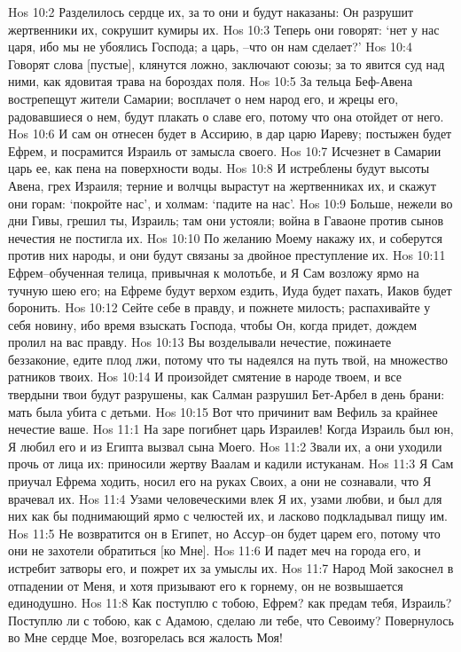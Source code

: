 Hos 10:2  Разделилось сердце их, за то они и будут наказаны: Он разрушит жертвенники их, сокрушит кумиры их.
Hos 10:3  Теперь они говорят: `нет у нас царя, ибо мы не убоялись Господа; а царь, --что он нам сделает?'
Hos 10:4  Говорят слова [пустые], клянутся ложно, заключают союзы; за то явится суд над ними, как ядовитая трава на бороздах поля.
Hos 10:5  За тельца Беф-Авена вострепещут жители Самарии; восплачет о нем народ его, и жрецы его, радовавшиеся о нем, будут плакать о славе его, потому что она отойдет от него.
Hos 10:6  И сам он отнесен будет в Ассирию, в дар царю Иареву; постыжен будет Ефрем, и посрамится Израиль от замысла своего.
Hos 10:7  Исчезнет в Самарии царь ее, как пена на поверхности воды.
Hos 10:8  И истреблены будут высоты Авена, грех Израиля; терние и волчцы вырастут на жертвенниках их, и скажут они горам: `покройте нас', и холмам: `падите на нас'.
Hos 10:9  Больше, нежели во дни Гивы, грешил ты, Израиль; там они устояли; война в Гаваоне против сынов нечестия не постигла их.
Hos 10:10  По желанию Моему накажу их, и соберутся против них народы, и они будут связаны за двойное преступление их.
Hos 10:11  Ефрем--обученная телица, привычная к молотьбе, и Я Сам возложу ярмо на тучную шею его; на Ефреме будут верхом ездить, Иуда будет пахать, Иаков будет боронить.
Hos 10:12  Сейте себе в правду, и пожнете милость; распахивайте у себя новину, ибо время взыскать Господа, чтобы Он, когда придет, дождем пролил на вас правду.
Hos 10:13  Вы возделывали нечестие, пожинаете беззаконие, едите плод лжи, потому что ты надеялся на путь твой, на множество ратников твоих.
Hos 10:14  И произойдет смятение в народе твоем, и все твердыни твои будут разрушены, как Салман разрушил Бет-Арбел в день брани: мать была убита с детьми.
Hos 10:15  Вот что причинит вам Вефиль за крайнее нечестие ваше.
Hos 11:1  На заре погибнет царь Израилев! Когда Израиль был юн, Я любил его и из Египта вызвал сына Моего.
Hos 11:2  Звали их, а они уходили прочь от лица их: приносили жертву Ваалам и кадили истуканам.
Hos 11:3  Я Сам приучал Ефрема ходить, носил его на руках Своих, а они не сознавали, что Я врачевал их.
Hos 11:4  Узами человеческими влек Я их, узами любви, и был для них как бы поднимающий ярмо с челюстей их, и ласково подкладывал пищу им.
Hos 11:5  Не возвратится он в Египет, но Ассур--он будет царем его, потому что они не захотели обратиться [ко Мне].
Hos 11:6  И падет меч на города его, и истребит затворы его, и пожрет их за умыслы их.
Hos 11:7  Народ Мой закоснел в отпадении от Меня, и хотя призывают его к горнему, он не возвышается единодушно.
Hos 11:8  Как поступлю с тобою, Ефрем? как предам тебя, Израиль? Поступлю ли с тобою, как с Адамою, сделаю ли тебе, что Севоиму? Повернулось во Мне сердце Мое, возгорелась вся жалость Моя!
